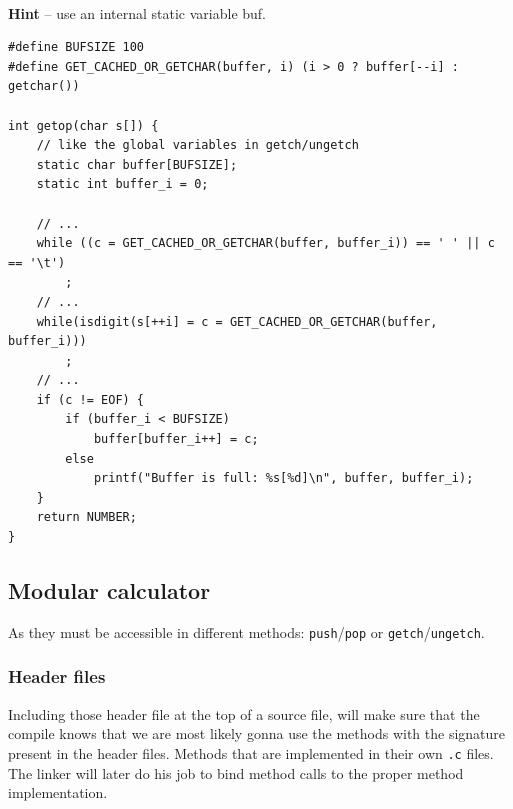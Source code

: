\pagebreak
{}
\\{\color{Gray} \textbf{Hint} -- use an internal static variable buf.}

\begin{lstlisting}
#define BUFSIZE 100
#define GET_CACHED_OR_GETCHAR(buffer, i) (i > 0 ? buffer[--i] : getchar())

int getop(char s[]) {
    // like the global variables in getch/ungetch
    static char buffer[BUFSIZE];
    static int buffer_i = 0;

    // ...
    while ((c = GET_CACHED_OR_GETCHAR(buffer, buffer_i)) == ' ' || c == '\t')
        ;
    // ...
    while(isdigit(s[++i] = c = GET_CACHED_OR_GETCHAR(buffer, buffer_i)))
        ;
    // ...
    if (c != EOF) {
        if (buffer_i < BUFSIZE)
            buffer[buffer_i++] = c;
        else
            printf("Buffer is full: %s[%d]\n", buffer, buffer_i);
    }
    return NUMBER;
}
\end{lstlisting}


\subsection{Modular calculator}



As they must be accessible in different methods: \verb!push!/\verb!pop! or \verb!getch!/\verb!ungetch!.


\subsubsection{Header files}


Including those header file at the top of a source file, will make sure that the compile knows that we are most likely gonna use the methods with the signature present in the header files. Methods that are implemented in their own \verb!.c! files.
The linker will later do his job to bind method calls to the proper method implementation.


